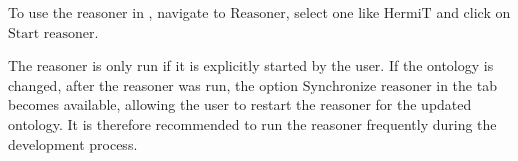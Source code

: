To use the reasoner in {\protege}, navigate to \textit{$\text{Reasoner}$}, select one like \textit{$\text{HermiT}$} and click on \textit{$\text{Start reasoner}$}.

The reasoner is only run if it is explicitly started by the user. If the ontology is changed, after the reasoner was run, the option \textit{$\text{Synchronize reasoner}$} in the tab becomes available, allowing the user to restart the reasoner for the updated ontology. It is therefore recommended to run the reasoner frequently during the development process.






